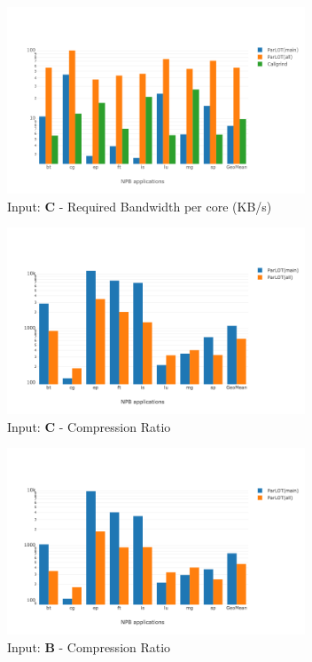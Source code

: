 \begin{figure}[!t]
\centering
\includegraphics[width=3.5in]{figs.comet/comet_chartAvg_bw_C_p3_5.png}
\caption{ Input: \textbf{C}  - Required Bandwidth per core (KB/s)
}
\label{comet_chartAvg_bw_C_p3_5}
\end{figure}







\begin{figure}[!t]
\centering
\includegraphics[width=3.5in]{figs.comet/comet_chartAvg_cr_C_p3_5.png}
\caption{ Input: \textbf{C}  - Compression Ratio
}
\label{comet_chartAvg_cr_C_p3_5}
\end{figure}


\begin{figure}[!t]
\centering
\includegraphics[width=3.5in]{figs.comet/comet_chartAvg_cr_B_p3_5.png}
\caption{ Input: \textbf{B}  - Compression Ratio
}
\label{comet_chartAvg_cr_B_p3_5}
\end{figure}



